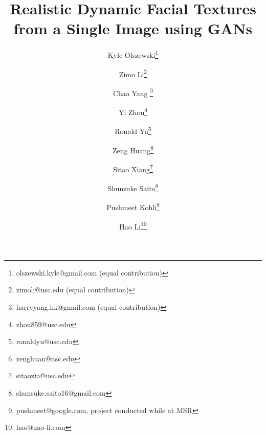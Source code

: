 \documentclass[10pt,twocolumn,letterpaper]{article}
\begin{document}
\title{Realistic Dynamic Facial Textures from a Single Image using GANs}


\author[1,3,4]{Kyle Olszewski\thanks{olszewski.kyle@gmail.com (equal contribution)}}
\author[1]{Zimo Li\thanks{zimoli@usc.edu (equal contribution)}}
\author[1]{Chao Yang \thanks{harryyang.hk@gmail.com (equal contribution)}}
\author[1]{Yi Zhou\thanks{zhou859@usc.edu}}
\author[1,3]{Ronald Yu\thanks{ronaldyu@usc.edu}}
\author[1]{Zeng Huang\thanks{zenghuan@usc.edu}}
\author[1]{Sitao Xiang\thanks{sitaoxia@usc.edu}}
\author[1,3]{Shunsuke Saito\thanks{shunsuke.saito16@gmail.com}}
\author[2]{Pushmeet Kohli\thanks{pushmeet@google.com, project conducted while at MSR}}
\author[1,3,4]{Hao Li\thanks{hao@hao-li.com}}

\maketitle
\thispagestyle{empty}
\end{document}

